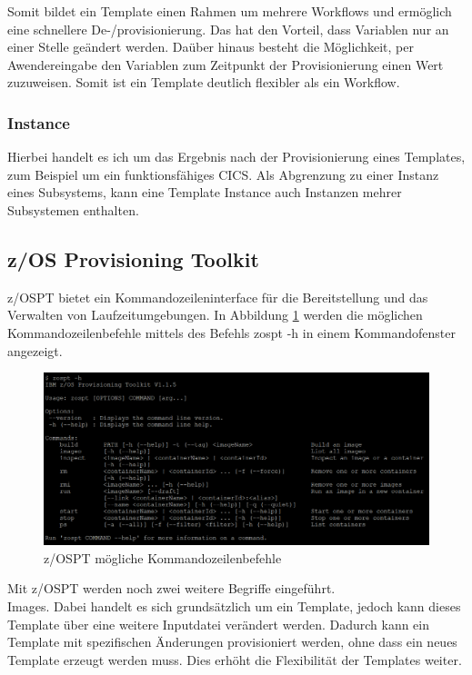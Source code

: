 Somit bildet ein Template einen Rahmen um mehrere Workflows und ermöglich eine schnellere De-/provisionierung.
Das hat den Vorteil, dass Variablen nur an einer Stelle geändert werden.
Daüber hinaus besteht die Möglichkeit, per Awendereingabe den Variablen zum Zeitpunkt der Provisionierung einen Wert zuzuweisen.
Somit ist ein Template deutlich flexibler als ein Workflow.
\cite{IBM.2019}

\subsubsection{Instance}\label{sssec:instance}
Hierbei handelt es ich um das Ergebnis nach der Provisionierung eines Templates, zum Beispiel um ein funktionsfähiges CICS.
Als Abgrenzung zu einer Instanz eines Subsystems, kann eine Template Instance auch Instanzen mehrer Subsystemen enthalten.

\subsection{z/OS Provisioning Toolkit}\label{sssec:zospt}
z/OSPT bietet ein Kommandozeileninterface für die Bereitstellung und das Verwalten von Laufzeitumgebungen.
In Abbildung \ref{fig:zospt_help} werden die möglichen Kommandozeilenbefehle mittels des Befehls \glqq zospt -h\grqq{} in einem Kommandofenster angezeigt.
\begin{figure}[h]
	\centering
	\includegraphics[width=\textwidth]{figures/zospt_help_putty.png}
	\caption{z/OSPT mögliche Kommandozeilenbefehle}
	\label{fig:zospt_help}
\end{figure}
Mit z/OSPT werden noch zwei weitere Begriffe eingeführt.\\
\glqq Images\grqq{}.
Dabei handelt es sich grundsätzlich um ein Template, jedoch kann dieses Template über eine weitere Inputdatei verändert werden.
Dadurch kann ein Template mit spezifischen Änderungen provisioniert werden, ohne dass ein neues Template erzeugt werden muss.
Dies erhöht die Flexibilität der Templates weiter.

